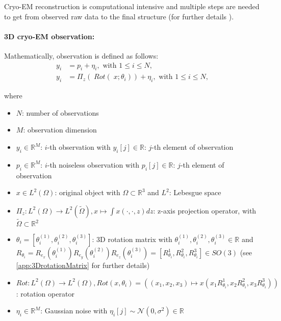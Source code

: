 Cryo-EM reconstruction is computational intensive and multiple steps are needed to get from observed
raw data to the final structure (for further details \cite{singleParticleCryoEm}).


\paragraph{3D cryo-EM observation:}
Mathematically, observation is defined as follows:
\begin{equation}
    \label{eq:cryoEmSimple}
    \begin{aligned}
        y_i &= p_i + \eta_i, \text{ with } 1 \leq i \leq N,\\
        y_i &= \Pi_z  (\; Rot (\;x; \theta_i )) + \eta_i, \text{ with } 1 \leq i \leq N,    
    \end{aligned}
\end{equation}

where 
\begin{itemize}
    \item $N$: number of observations
    \item $M$: observation dimension
    \item $y_i \in \mathbb{R}^M$:  $i$-th observation with $y_i[j] \in \mathbb{R}$: $j$-th element of observation
    \item $p_i \in \mathbb{R}^M$:  $i$-th noiseless observation with $p_i[j] \in \mathbb{R}$: $j$-th element of observation
    \item $x \in L^2(\Omega)$: original object with $\Omega \subset \mathbb{R}^3 $ and $L^2$: Lebesgue space
    \item $\Pi_z : L^2(\Omega) \to L^2(\tilde{\Omega}), x \mapsto  \int x(\cdot,\cdot,z) dz$: z-axis projection operator,
          with $\tilde{\Omega} \subset \mathbb{R}^2$
    \item $\theta_i = [\theta_i^{(1)}, \theta_i^{(2)}, \theta_i^{(3)} ] $: 3D rotation matrix with $ \theta_i^{(1)}, \theta_i^{(2)}, \theta_i^{(3)} \in \mathbb{R}$ and \\
          $R_{\theta_i} =  R_{e_x} (\theta_i^{(1)}) R_{e_y} (\theta_i^{(2)}) R_{e_z} (\theta_i^{(3)}) = [R^1_{\theta_i}, R^2_{\theta_i}, R^3_{\theta_i}] \in SO(3)$ 
          (see \ref{app:3DrotationMatrix} for further details)
    \item $\textit{Rot} : L^2(\Omega) \to L^2(\Omega), \textit{Rot}(x, \theta_i) = \left((x_1,x_2,x_3) \mapsto x( x_1R^1_{\theta_i}, x_2R^2_{\theta_i}, x_3R^3_{\theta_i})\right)$: rotation operator
    \item $\eta_i \in \mathbb{R}^M$: Gaussian noise with $\eta_i[j] \sim \mathcal{N}(0,\sigma^2) \in \mathbb{R}$
\end{itemize}

